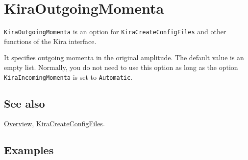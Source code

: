 \documentclass[../FeynHelpersManual.tex]{subfiles}
\begin{document}
\hypertarget{kiraoutgoingmomenta}{
\section{KiraOutgoingMomenta}\label{kiraoutgoingmomenta}}

\texttt{KiraOutgoingMomenta} is an option for
\texttt{KiraCreateConfigFiles} and other functions of the Kira
interface.

It specifies outgoing momenta in the original amplitude. The default
value is an empty list. Normally, you do not need to use this option as
long as the option \texttt{KiraIncomingMomenta} is set to
\texttt{Automatic}.

\subsection{See also}

\hyperlink{toc}{Overview},
\hyperlink{kiracreateconfigfiles}{KiraCreateConfigFiles}.

\subsection{Examples}
\end{document}
